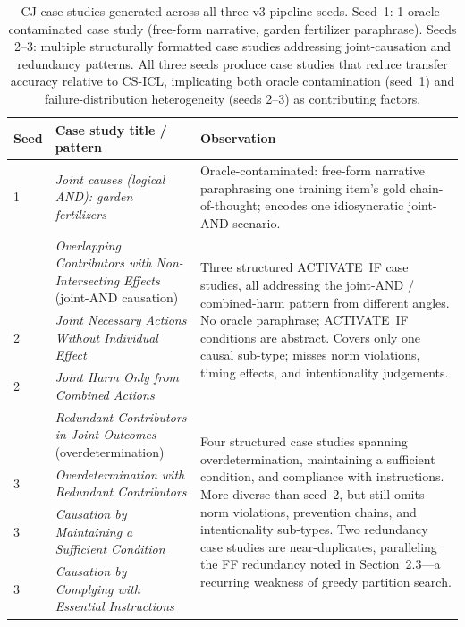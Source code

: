 \documentclass{article}
\begin{document}
\begin{table}[h]
  \caption{CJ case studies generated across all three v3 pipeline seeds.
    Seed~1: 1 oracle-contaminated case study (free-form narrative, garden fertilizer paraphrase).
    Seeds 2--3: multiple structurally formatted case studies addressing joint-causation and
    redundancy patterns.
    All three seeds produce case studies that reduce transfer accuracy relative to CS-ICL,
    implicating both oracle contamination (seed~1) and failure-distribution heterogeneity
    (seeds 2--3) as contributing factors.}
  \label{tab:cj_casestudies}
  \centering
  \smallskip
  \begin{tabular}{p{0.5cm} p{5.2cm} p{5.0cm}}
    \toprule
    \textbf{Seed} & \textbf{Case study title / pattern} & \textbf{Observation} \\
    \midrule
    1 &
      \textit{Joint causes (logical AND): garden fertilizers} &
      Oracle-contaminated: free-form narrative paraphrasing one training item's gold
      chain-of-thought; encodes one idiosyncratic joint-AND scenario. \\
    \addlinespace
    2 &
      \textit{Overlapping Contributors with Non-Intersecting Effects}
      (joint-AND causation) &
      \multirow{3}{5.0cm}{Three structured ACTIVATE~IF case studies, all addressing the
      joint-AND / combined-harm pattern from different angles.
      No oracle paraphrase; ACTIVATE~IF conditions are abstract.
      Covers only one causal sub-type; misses norm violations, timing effects, and
      intentionality judgements.} \\
    2 & \textit{Joint Necessary Actions Without Individual Effect} & \\
    2 & \textit{Joint Harm Only from Combined Actions} & \\
    \addlinespace
    3 &
      \textit{Redundant Contributors in Joint Outcomes} (overdetermination)
      &
      \multirow{4}{5.0cm}{Four structured case studies spanning overdetermination,
      maintaining a sufficient condition, and compliance with instructions.
      More diverse than seed~2, but still omits norm violations, prevention chains,
      and intentionality sub-types. Two redundancy case studies are near-duplicates,
      paralleling the FF redundancy noted in Section~2.3---a recurring weakness of greedy
      partition search.} \\
    3 & \textit{Overdetermination with Redundant Contributors} & \\
    3 & \textit{Causation by Maintaining a Sufficient Condition} & \\
    3 & \textit{Causation by Complying with Essential Instructions} & \\
    \bottomrule
  \end{tabular}
\end{table}



\end{document}
